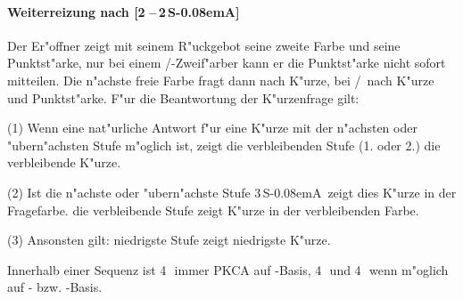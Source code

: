 \documentclass[11pt,german,twocolumn]{scrartcl}
\def\pik{\nobreak\,\Sp}
\def\coe{\nobreak\,\He}
\def\kar{\nobreak\,\Di}
\def\tre{\nobreak\,\Cl}
\def\co{\He}
\def\ka{\Di}
\def\tr{\Cl}
\def\sa{\nobreak\textsf{S\kern-0.08emA}}
\def\SA{\nobreak\,\sa}
\def\sep{\nobreak\,--\,}
\begin{document}
\paragraph{Weiterreizung nach [2\coe\sep2\SA]}

Der Er"offner zeigt mit seinem R"uckgebot seine zweite Farbe und seine
Punktst"arke, nur bei einem \co/\tr-Zweif"arber kann er die Punktst"arke nicht
sofort mitteilen. Die n"achste freie Farbe fragt dann nach K"urze, bei \co/\tr\
nach K"urze und Punktst"arke. F"ur die Beantwortung der K"urzenfrage gilt:

(1) Wenn eine nat"urliche Antwort f"ur eine K"urze mit der n"achsten oder
"ubern"achsten Stufe m"oglich ist, zeigt die verbleibenden Stufe (1. oder 2.)
die verbleibende K"urze.

(2) Ist die n"achste oder "ubern"achste Stufe 3\SA\, zeigt dies K"urze in der
Fragefarbe. die verbleibende Stufe zeigt K"urze in der verbleibenden Farbe.

(3) Ansonsten gilt: niedrigste Stufe zeigt niedrigste K"urze.

Innerhalb einer Sequenz ist 4\pik\ immer PKCA auf \co-Basis, 4\tre\ und 4\kar\
wenn m"oglich auf \tr- bzw. \ka-Basis.
\end{document}
